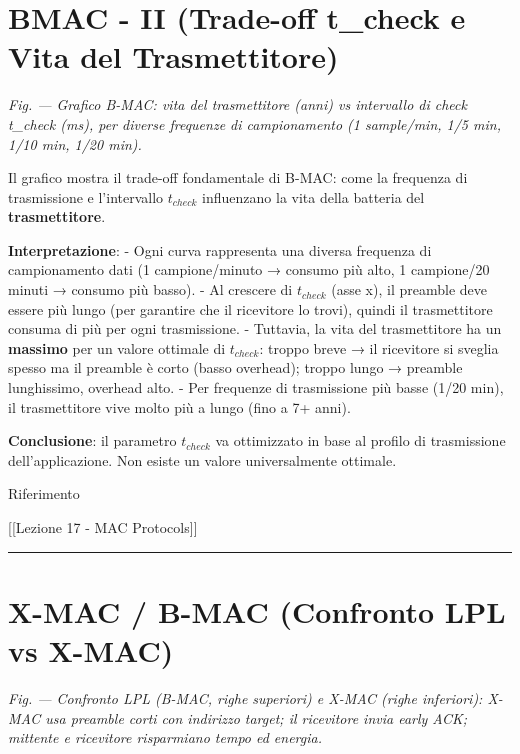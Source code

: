 \documentclass[
  italian,
  openany]{book}
\begin{document}
\section{BMAC - II (Trade-off t\_check e Vita del
Trasmettitore)}\label{bmac---ii-trade-off-t_check-e-vita-del-trasmettitore}

\emph{Fig. --- Grafico B-MAC: vita del trasmettitore (anni) vs
intervallo di check t\_check (ms), per diverse frequenze di
campionamento (1 sample/min, 1/5 min, 1/10 min, 1/20 min).}

Il grafico mostra il trade-off fondamentale di B-MAC: come la frequenza
di trasmissione e l'intervallo \(t_{check}\) influenzano la vita della
batteria del \textbf{trasmettitore}.

\textbf{Interpretazione}: - Ogni curva rappresenta una diversa frequenza
di campionamento dati (1 campione/minuto → consumo più alto, 1
campione/20 minuti → consumo più basso). - Al crescere di \(t_{check}\)
(asse x), il preamble deve essere più lungo (per garantire che il
ricevitore lo trovi), quindi il trasmettitore consuma di più per ogni
trasmissione. - Tuttavia, la vita del trasmettitore ha un
\textbf{massimo} per un valore ottimale di \(t_{check}\): troppo breve →
il ricevitore si sveglia spesso ma il preamble è corto (basso overhead);
troppo lungo → preamble lunghissimo, overhead alto. - Per frequenze di
trasmissione più basse (1/20 min), il trasmettitore vive molto più a
lungo (fino a 7+ anni).

\textbf{Conclusione}: il parametro \(t_{check}\) va ottimizzato in base
al profilo di trasmissione dell'applicazione. Non esiste un valore
universalmente ottimale.

\begin{calloutnote}{Riferimento}

{[}{[}Lezione 17 - MAC Protocols{]}{]}

\end{calloutnote}

\begin{center}\rule{0.5\linewidth}{0.5pt}\end{center}

\section{X-MAC / B-MAC (Confronto LPL vs
X-MAC)}\label{x-mac-b-mac-confronto-lpl-vs-x-mac}

\emph{Fig. --- Confronto LPL (B-MAC, righe superiori) e X-MAC (righe
inferiori): X-MAC usa preamble corti con indirizzo target; il ricevitore
invia early ACK; mittente e ricevitore risparmiano tempo ed energia.}
\end{document}
